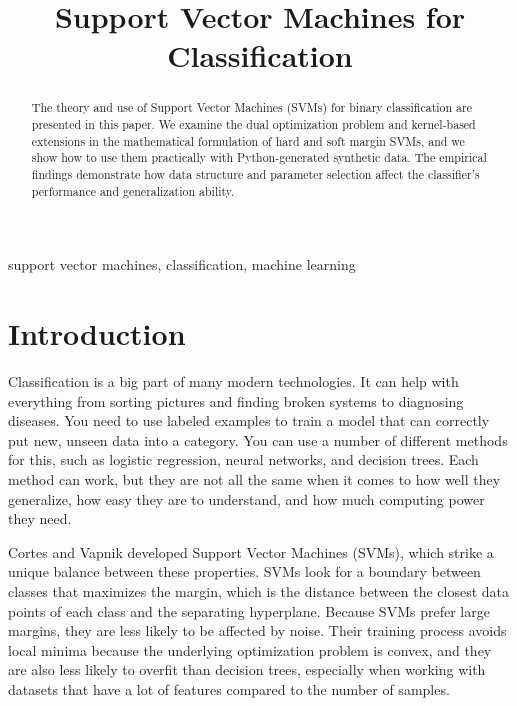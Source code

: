 \documentclass[conference]{IEEEtran}
\begin{document}
	
	\title{Support Vector Machines for Classification}
	
	\author{
	}
	
	\maketitle
	
	\begin{abstract}
		The theory and use of Support Vector Machines (SVMs) for binary classification are presented in this paper. We examine the dual optimization problem and kernel-based extensions in the mathematical formulation of hard and soft margin SVMs, and we show how to use them practically with Python-generated synthetic data. The empirical findings demonstrate how data structure and parameter selection affect the classifier's performance and generalization ability.
	\end{abstract}
	
	\begin{IEEEkeywords}
		support vector machines, classification, machine learning
	\end{IEEEkeywords}
	
	\section{Introduction}
	
	Classification is a big part of many modern technologies. It can help with everything from sorting pictures and finding broken systems to diagnosing diseases. You need to use labeled examples to train a model that can correctly put new, unseen data into a category. You can use a number of different methods for this, such as logistic regression, neural networks, and decision trees. Each method can work, but they are not all the same when it comes to how well they generalize, how easy they are to understand, and how much computing power they need.
	
	Cortes and Vapnik developed Support Vector Machines (SVMs), which strike a unique balance between these properties. SVMs look for a boundary between classes that maximizes the margin, which is the distance between the closest data points of each class and the separating hyperplane. Because SVMs prefer large margins, they are less likely to be affected by noise. Their training process avoids local minima because the underlying optimization problem is convex, and they are also less likely to overfit than decision trees, especially when working with datasets that have a lot of features compared to the number of samples.
	
\end{document}

